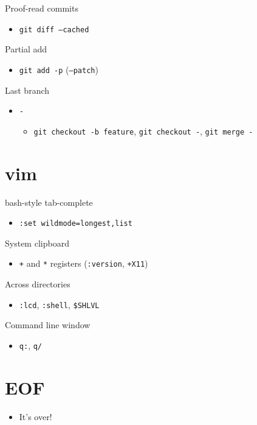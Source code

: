 \documentclass{beamer}
\begin{document}
\begin{frame}{Proof-read commits}
\begin{itemize}
	\item \texttt{git diff --cached}
\end{itemize}
\end{frame}

\begin{frame}{Partial add}
\begin{itemize}
	\item \texttt{git add -p} (\texttt{--patch})
\end{itemize}
\end{frame}

\begin{frame}{Last branch}
\begin{itemize}
	\item \texttt{-}
	\begin{itemize}
		\item \texttt{git checkout -b feature}, \texttt{git checkout -}, \texttt{git merge -}
	\end{itemize}
\end{itemize}
\end{frame}

\section{vim}

\begin{frame}[fragile]{bash-style tab-complete}
\begin{itemize}
	\item \texttt{:set wildmode=longest,list}
\end{itemize}
\end{frame}

\begin{frame}[fragile]{System clipboard}
\begin{itemize}
	\item \texttt{+} and \texttt{*} registers (\texttt{:version}, \texttt{+X11})
\end{itemize}
\end{frame}

\begin{frame}[fragile]{Across directories}
\begin{itemize}
	\item \texttt{:lcd}, \texttt{:shell}, \verb|$SHLVL|
\end{itemize}
\end{frame}

\begin{frame}[fragile]{Command line window}
\begin{itemize}
	\item \texttt{q:}, \texttt{q/}
\end{itemize}
\end{frame}

\section*{EOF}
\begin{frame}
\begin{itemize}
	\item It's over!
\end{itemize}
\end{frame}
\end{document}
